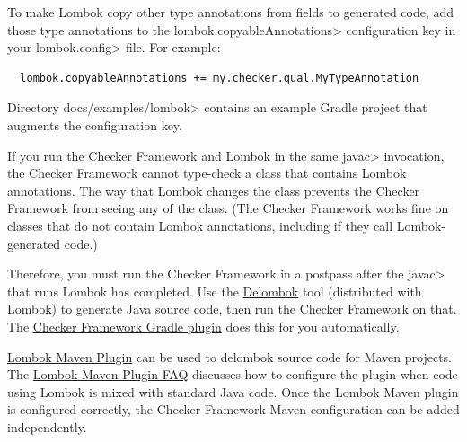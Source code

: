 To make Lombok copy other type annotations from fields to generated code,
add those type annotations to the \<lombok.copyableAnnotations>
configuration key in your \<lombok.config> file.  For example:

\begin{Verbatim}
  lombok.copyableAnnotations += my.checker.qual.MyTypeAnnotation
\end{Verbatim}

Directory \<docs/examples/lombok> contains an example Gradle project that
augments the configuration key.





If you run the Checker Framework and Lombok in the same \<javac>
invocation, the Checker Framework cannot type-check a class that contains
Lombok annotations.  The way that Lombok changes the class prevents the
Checker Framework from seeing any of the class.  (The Checker Framework
works fine on classes that do not contain Lombok annotations, including if
they call Lombok-generated code.)

Therefore, you must run the Checker Framework in a postpass after the
\<javac> that runs Lombok has completed.  Use the
\href{https://projectlombok.org/features/delombok}{Delombok} tool
(distributed with Lombok) to generate Java source code, then run the
Checker Framework on that.  The
\href{https://github.com/kelloggm/checkerframework-gradle-plugin}{Checker
  Framework Gradle plugin} does this for you automatically.



\href{https://anthonywhitford.com/lombok.maven/lombok-maven-plugin/}{Lombok Maven Plugin}
can be used to delombok source code for Maven projects. The
\href{https://anthonywhitford.com/lombok.maven/lombok-maven-plugin/faq.html#alt-src-setup}
{Lombok Maven Plugin FAQ} discusses how to configure the plugin when code
using Lombok is mixed with standard Java code. Once the Lombok Maven plugin
is configured correctly, the Checker Framework Maven configuration can be added
independently.


